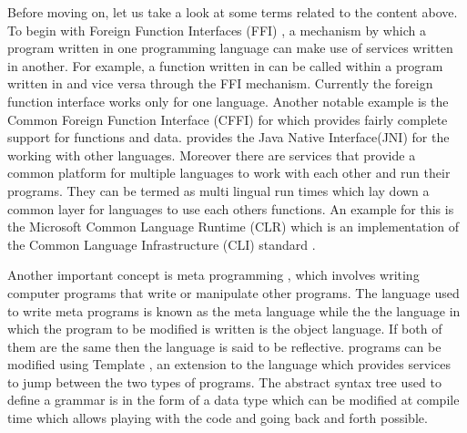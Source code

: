\documentclass[thesis-solanki.tex]{subfiles}
\begin{document}
Before moving on, let us take a look at some terms related to the content above.
To begin with Foreign Function Interfaces (FFI) \cite{website:ffiwiki}, a mechanism by which a program written in
one programming language can make use of services written in another.
For example, a function written in  can be called within a program written in  and
vice versa through the FFI mechanism.
Currently the  foreign function interface works only for one language.
Another notable example is the Common Foreign Function Interface (CFFI) \cite{website:commonlisp} for
 which provides fairly complete support for  functions and data.
 provides the Java Native Interface(JNI) for the working with other languages.
Moreover there are services that provide a common platform for multiple languages to work with each other and run
their programs.
They can be termed as multi lingual run times which lay down a common layer for languages to use each others
functions.
An example for this is the Microsoft Common Language Runtime (CLR) \cite{website:clrwiki} which is an
implementation of the Common Language Infrastructure (CLI) standard \cite{website:cliwiki}.

Another important concept is meta programming \cite{website:metaprogwiki}, which involves writing computer programs
that write or manipulate other programs.
The language used to write meta programs is known as the meta language while the the language in which the program
to be modified is written is the object language.
If both of them are the same then the language is said to be reflective.
 programs can be modified using Template  \cite{website:templatehaskell}, an
extension to the language which provides services to jump between the two types of programs.
The abstract syntax tree used to define a grammar is in the form of a  data type which can be modified at compile time which allows playing with the code and going back and forth possible.
\end{document}
